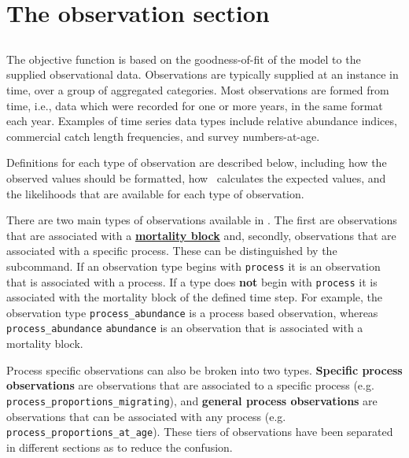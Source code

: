\section{The observation section\label{sec:observation-section}}

\subsection{\label{sec:Observations}}

The objective function is based on the goodness-of-fit of the model to the supplied observational data. Observations are typically supplied at an instance in time, over a group of aggregated categories. Most observations are formed from time, i.e., data which were recorded for one or more years, in the same format each year. Examples of time series data types include relative abundance indices, commercial catch length frequencies, and survey numbers-at-age.

Definitions for each type of observation are described below, including how the observed values should be formatted, how \CNAME\ calculates the expected values, and the likelihoods that are available for each type of observation.

There are two main types of observations available in \CNAME. The first are observations that are associated with a \hyperref[sec:mortality_block]{\textbf{mortality block}} and, secondly, observations that are associated with a specific process. These can be distinguished by the  subcommand. If an observation type begins with \texttt{process} it is an observation that is associated with a process. If a type does \textbf{not} begin with \texttt{process} it is associated with the mortality block of the defined time step. For example, the observation type \texttt{process\_abundance} is a process based observation, whereas \texttt{process\_abundance} \texttt{abundance} is an observation that is associated with a mortality block.

Process specific observations can also be broken into two types. \textbf{Specific process observations} are observations that are associated to a specific process (e.g. \texttt{process\_proportions\_migrating}), and \textbf{general process observations} are observations that can be associated with any process (e.g. \texttt{process\_proportions\_at\_age}). These tiers of observations have been separated in different sections as to reduce the confusion.

